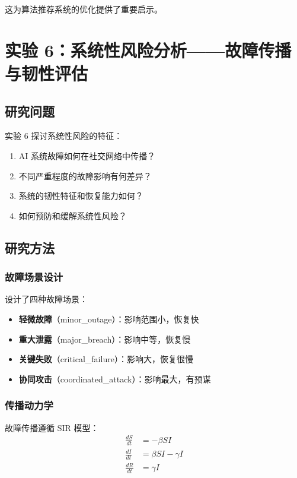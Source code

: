 \documentclass[a4paper,12pt]{article}
\begin{document}
这为算法推荐系统的优化提供了重要启示。

\section{实验 6：系统性风险分析——故障传播与韧性评估}

\subsection{研究问题}

实验 6 探讨系统性风险的特征：
\begin{enumerate}
    \item AI 系统故障如何在社交网络中传播？
    \item 不同严重程度的故障影响有何差异？
    \item 系统的韧性特征和恢复能力如何？
    \item 如何预防和缓解系统性风险？
\end{enumerate}

\subsection{研究方法}

\subsubsection{故障场景设计}

设计了四种故障场景：
\begin{itemize}
    \item \textbf{轻微故障}（minor\_outage）：影响范围小，恢复快
    \item \textbf{重大泄露}（major\_breach）：影响中等，恢复慢
    \item \textbf{关键失败}（critical\_failure）：影响大，恢复很慢
    \item \textbf{协同攻击}（coordinated\_attack）：影响最大，有预谋
\end{itemize}

\subsubsection{传播动力学}

故障传播遵循 SIR 模型：
\begin{align}
    \frac{dS}{dt} &= -\beta S I \\
    \frac{dI}{dt} &= \beta S I - \gamma I \\
    \frac{dR}{dt} &= \gamma I
\end{align}
\end{document}
